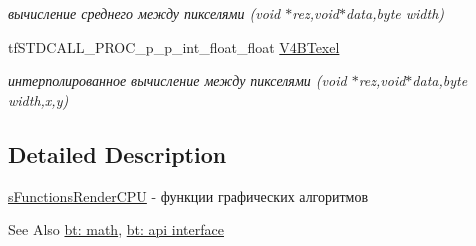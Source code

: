 \begin{DoxyCompactItemize}
\begin{DoxyCompactList}\small\item\em вычисление среднего между пикселями (void $\ast$rez,void$\ast$data,byte width) \end{DoxyCompactList}\item 
\hypertarget{structs_functions_render_c_p_u_a1c0ada12bebb0599ecde0974765d562c}{tf\-S\-T\-D\-C\-A\-L\-L\-\_\-\-P\-R\-O\-C\-\_\-p\-\_\-p\-\_\-int\-\_\-float\-\_\-float \hyperlink{structs_functions_render_c_p_u_a1c0ada12bebb0599ecde0974765d562c}{V4\-B\-Texel}}\label{structs_functions_render_c_p_u_a1c0ada12bebb0599ecde0974765d562c}

\begin{DoxyCompactList}\small\item\em интерполированное вычисление между пикселями (void $\ast$rez,void$\ast$data,byte width,x,y) \end{DoxyCompactList}\end{DoxyCompactItemize}


\subsection{Detailed Description}
\hyperlink{structs_functions_render_c_p_u}{s\-Functions\-Render\-C\-P\-U} -\/ функции графических алгоритмов 

\begin{DoxySeeAlso}{See Also}
\hyperlink{group__math}{bt\-: math}, \hyperlink{group__apiinterface}{bt\-: api interface} 
\end{DoxySeeAlso}
